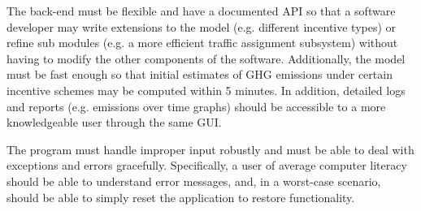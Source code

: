 \documentclass[draft,12pt,titlepage]{article}
\begin{document}
The back-end must be flexible and have a documented API so that a software developer may
write extensions to the model (e.g. different incentive types) or refine sub modules (e.g. a
more efficient traffic assignment subsystem) without having to modify the other components
of the software. Additionally, the model must be fast enough so that initial estimates of GHG
emissions under certain incentive schemes may be computed within 5 minutes. In addition,
detailed logs and reports (e.g. emissions over time graphs) should be accessible to a more
knowledgeable user through the same GUI.

The program must handle improper input robustly and must be able to deal with exceptions
and errors gracefully. Specifically, a user of average computer literacy should be able to
understand error messages, and, in a worst-case scenario, should be able to simply reset the
application to restore functionality.
\end{document}
